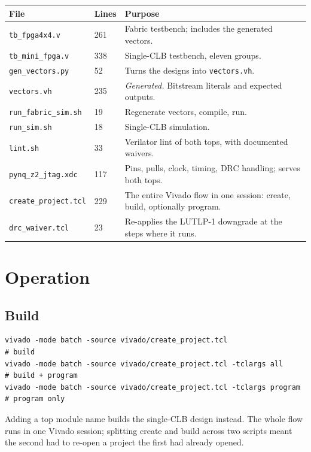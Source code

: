 \documentclass[11pt,a4paper]{article}
\newcommand{\file}[1]{\texttt{#1}}
\begin{document}
\begin{longtable}{llp{72mm}}
\toprule
\textbf{File} & \textbf{Lines} & \textbf{Purpose} \\
\midrule
\endhead
\file{tb\_fpga4x4.v}      & 261 & Fabric testbench; includes the generated vectors. \\
\file{tb\_mini\_fpga.v}   & 338 & Single-CLB testbench, eleven groups. \\
\file{gen\_vectors.py}    & 52  & Turns the designs into \file{vectors.vh}. \\
\file{vectors.vh}         & 235 & \emph{Generated.} Bitstream literals and expected outputs. \\
\file{run\_fabric\_sim.sh}& 19  & Regenerate vectors, compile, run. \\
\file{run\_sim.sh}        & 18  & Single-CLB simulation. \\
\file{lint.sh}            & 33  & Verilator lint of both tops, with documented waivers. \\
\file{pynq\_z2\_jtag.xdc} & 117 & Pins, pulls, clock, timing, DRC handling; serves both tops. \\
\file{create\_project.tcl}& 229 & The entire Vivado flow in one session: create, build, optionally program. \\
\file{drc\_waiver.tcl}    & 23  & Re-applies the LUTLP-1 downgrade at the steps where it runs. \\
\bottomrule
\end{longtable}

\section{Operation}

\subsection{Build}

\begin{lstlisting}[style=sh]
vivado -mode batch -source vivado/create_project.tcl                  # build
vivado -mode batch -source vivado/create_project.tcl -tclargs all     # build + program
vivado -mode batch -source vivado/create_project.tcl -tclargs program # program only
\end{lstlisting}

Adding a top module name builds the single-CLB design instead. The whole flow
runs in one Vivado session; splitting create and build across two scripts meant
the second had to re-open a project the first had already opened.
\end{document}
